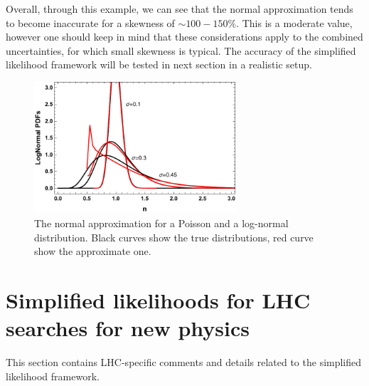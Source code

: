 \documentclass[11pt]{article}
\begin{document}
   Overall, through this example, we can see that the normal approximation tends to become inaccurate for a skewness of $\sim 100-150\%$. This is a moderate value, however one should keep in mind that these considerations apply to the combined uncertainties, for which small skewness is typical. The accuracy of the simplified likelihood framework will be tested in next section in a realistic setup.












\begin{figure}%
\begin{center}
\includegraphics[width=7.5cm]{figures/PlotLogNormal.pdf}
\end{center}
\caption{\label{fig:approxs}
The normal approximation for a Poisson and a log-normal distribution. Black curves show the true distributions, red curve show the approximate one.
}
\end{figure}


\section{Simplified likelihoods for LHC searches for new physics}
\label{se:SL_LHC}

This section contains LHC-specific comments and details related to the simplified likelihood framework.
\end{document}
